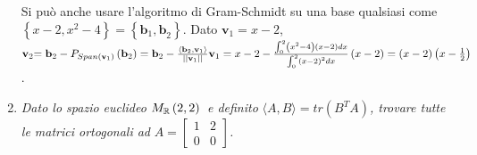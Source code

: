 \documentclass{article}
\begin{document}
\begin{enumerate}
Si pu\`{o} anche usare l'algoritmo di Gram-Schmidt su una base qualsiasi
come $\left\{ x-2,x^{2}-4\right\} =\left\{ \mathbf{b}_{1}\mathbf{,b}%
_{2}\right\} $. Dato $\mathbf{v}_{1}=x-2$, $\mathbf{v}_{2}\mathbf{=b}%
_{2}-P_{Span\left( \mathbf{v}_{1}\right) }\left( \mathbf{b}_{2}\right) =%
\mathbf{b}_{2}-\frac{\left\langle \mathbf{b}_{2},\mathbf{v}_{1}\right\rangle 
}{\left\vert \left\vert \mathbf{v}_{1}\right\vert \right\vert }\mathbf{v}%
_{1}=x-2-\frac{\int_{0}^{2}\left( x^{2}-4\right) \left( x-2\right) dx}{%
\int_{0}^{2}\left( x-2\right) ^{2}dx}\left( x-2\right) =\left( x-2\right)
\left( x-\frac{1}{2}\right) $.

\item \textit{Dato lo spazio euclideo }$M_{%
\mathbb{R}
}\left( 2,2\right) $\textit{\ e definito }$\langle A,B\rangle =tr\left(
B^{T}A\right) $\textit{, trovare tutte le matrici ortogonali ad }$A=\left[ 
\begin{array}{cc}
1 & 2 \\ 
0 & 0%
\end{array}%
\right] $\textit{.}


\end{enumerate}
\end{document}
